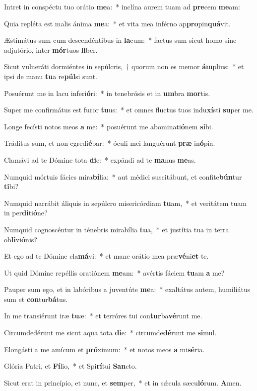 \item Intret in conspéctu tuo orátio \textbf{me}a:~* inclína aurem tuam ad \textbf{pre}cem \textbf{me}am:
\item Quia repléta est malis ánima \textbf{me}a:~* et vita mea inférno ap\textbf{pro}pin\textbf{quá}vit.
\item Æstimátus sum cum descendéntibus in \textbf{la}cum:~* factus sum sicut homo sine adjutório, inter \textbf{mór}tuos \textbf{li}ber.
\item Sicut vulneráti dormiéntes in sepúlcris,~† quorum non es memor \textbf{ám}plius:~* et ipsi de manu \textbf{tu}a re\textbf{púl}si sunt.
\item Posuérunt me in lacu inferi\textbf{ó}ri:~* in tenebrósis et in \textbf{um}bra \textbf{mor}tis.
\item Super me confirmátus est furor \textbf{tu}us:~* et omnes fluctus tuos indu\textbf{xí}sti \textbf{su}per me.
\item Longe fecísti notos meos \textbf{a} me:~* posuérunt me abominati\textbf{ó}nem \textbf{si}bi.
\item Tráditus sum, et non egredi\textbf{é}bar:~* óculi mei languérunt \textbf{præ} in\textbf{ó}pia.
\item Clamávi ad te Dómine tota \textbf{di}e:~* expándi ad te \textbf{ma}nus \textbf{me}as.
\item Numquid mórtuis fácies mira\textbf{bí}lia:~* aut médici suscitábunt, et confite\textbf{bún}tur \textbf{ti}bi?
\item Numquid narrábit áliquis in sepúlcro misericórdiam \textbf{tu}am,~* et veritátem tuam in per\textbf{di}ti\textbf{ó}ne?
\item Numquid cognoscéntur in ténebris mirabília \textbf{tu}a,~* et justítia tua in terra ob\textbf{li}vi\textbf{ó}nis?
\item Et ego ad te Dómine cla\textbf{má}vi:~* et mane orátio mea præ\textbf{vé}ni\textbf{et} te.
\item Ut quid Dómine repéllis oratiónem \textbf{me}am:~* avértis fáciem \textbf{tu}am \textbf{a} me?
\item Pauper sum ego, et in labóribus a juventúte \textbf{me}a:~* exaltátus autem, humiliátus sum et \textbf{con}tur\textbf{bá}tus.
\item In me transiérunt iræ \textbf{tu}æ:~* et terróres tui con\textbf{tur}ba\textbf{vé}runt me.
\item Circumdedérunt me sicut aqua tota \textbf{di}e:~* circumde\textbf{dé}runt me \textbf{si}mul.
\item Elongásti a me amícum et \textbf{pró}ximum:~* et notos meos \textbf{a} mi\textbf{sé}ria.
\item Glória Patri, et \textbf{Fí}lio,~* et Spi\textbf{rí}tui \textbf{San}cto.
\item Sicut erat in princípio, et nunc, et \textbf{sem}per,~* et in sǽcula sæcu\textbf{ló}rum. \textbf{A}men.